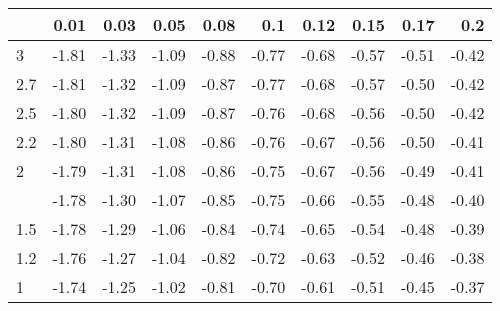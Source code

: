 
\begin{tabular}{lrrrrrrrrr}
\toprule
  & 0.01 & 0.03 & 0.05 & 0.08 & 0.1 & 0.12 & 0.15 & 0.17 & 0.2\\
\midrule
3 & -1.81 & -1.33 & -1.09 & -0.88 & -0.77 & -0.68 & -0.57 & -0.51 & -0.42\\
2.7 & -1.81 & -1.32 & -1.09 & -0.87 & -0.77 & -0.68 & -0.57 & -0.50 & -0.42\\
2.5 & -1.80 & -1.32 & -1.09 & -0.87 & -0.76 & -0.68 & -0.56 & -0.50 & -0.42\\
2.2 & -1.80 & -1.31 & -1.08 & -0.86 & -0.76 & -0.67 & -0.56 & -0.50 & -0.41\\
2 & -1.79 & -1.31 & -1.08 & -0.86 & -0.75 & -0.67 & -0.56 & -0.49 & -0.41\\
\addlinespace
1.7 & -1.78 & -1.30 & -1.07 & -0.85 & -0.75 & -0.66 & -0.55 & -0.48 & -0.40\\
1.5 & -1.78 & -1.29 & -1.06 & -0.84 & -0.74 & -0.65 & -0.54 & -0.48 & -0.39\\
1.2 & -1.76 & -1.27 & -1.04 & -0.82 & -0.72 & -0.63 & -0.52 & -0.46 & -0.38\\
1 & -1.74 & -1.25 & -1.02 & -0.81 & -0.70 & -0.61 & -0.51 & -0.45 & -0.37\\
\bottomrule
\end{tabular}
